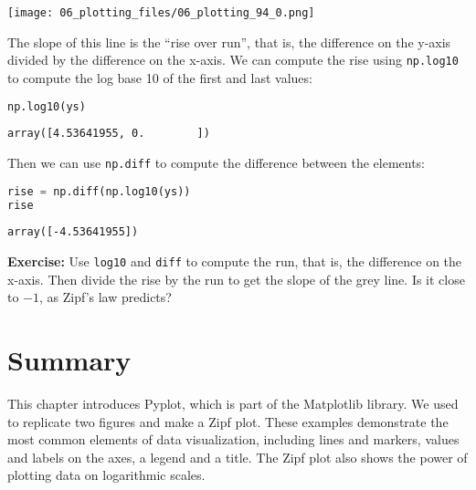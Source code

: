 \begin{center}
\texttt{[image: 06\_plotting\_files/06\_plotting\_94\_0.png]}
\end{center}

The slope of this line is the ``rise over run'', that is, the difference
on the y-axis divided by the difference on the x-axis. We can compute
the rise using \passthrough{\lstinline!np.log10!} to compute the log
base 10 of the first and last values:

\begin{lstlisting}[language=Python,style=source]
np.log10(ys)
\end{lstlisting}

\begin{lstlisting}[style=output]
array([4.53641955, 0.        ])
\end{lstlisting}

Then we can use \passthrough{\lstinline!np.diff!} to compute the
difference between the elements:

\begin{lstlisting}[language=Python,style=source]
rise = np.diff(np.log10(ys))
rise
\end{lstlisting}

\begin{lstlisting}[style=output]
array([-4.53641955])
\end{lstlisting}

\textbf{Exercise:} Use \passthrough{\lstinline!log10!} and
\passthrough{\lstinline!diff!} to compute the run, that is, the
difference on the x-axis. Then divide the rise by the run to get the
slope of the grey line. Is it close to \(-1\), as Zipf's law predicts?

\section{Summary}\label{summary}

This chapter introduces Pyplot, which is part of the Matplotlib library.
We used to replicate two figures and make a Zipf plot. These examples
demonstrate the most common elements of data visualization, including
lines and markers, values and labels on the axes, a legend and a title.
The Zipf plot also shows the power of plotting data on logarithmic
scales.
